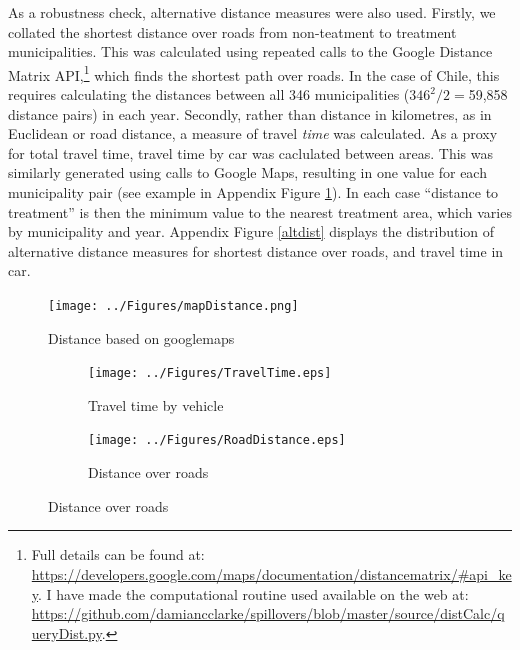 \documentclass[11pt,subeqn]{article}
\begin{document}
\begin{spacing}{1.4}
As a robustness check, alternative distance measures were also used.
Firstly, we collated the shortest distance over roads from non-teatment to 
treatment municipalities.  This was calculated using repeated calls to the 
Google Distance Matrix API,\footnote{Full details can be found at:
\url{https://developers.google.com/maps/documentation/distancematrix/\#api\_key}.
I have made the computational routine used available on the web at:
\url{https://github.com/damiancclarke/spillovers/blob/master/source/distCalc/queryDist.py}.}
which finds the shortest path over roads.  In the case of Chile, this requires 
calculating the distances between all 346 municipalities ($346^2/2=$59,858
distance pairs) in each year.  Secondly, rather than distance in 
kilometres, as in Euclidean or road distance, a measure of travel \emph{time} 
was calculated.  As a proxy for total travel time, travel time by car was 
caclulated between areas.  This was similarly generated using calls to Google 
Maps, resulting in one value for each municipality pair (see example in Appendix
Figure \ref{googdist}).  In each case ``distance to treatment'' is then the 
minimum value to the nearest treatment area, which varies by municipality and 
year.  Appendix Figure \ref{altdist} displays the distribution of alternative
distance measures for shortest distance over roads, and travel time in car.

\begin{figure}[htpb!]
\texttt{[image: ../Figures/mapDistance.png]}
\caption{Distance based on googlemaps}
\label{googdist}
\end{figure}

\begin{figure}[htpb!]
\begin{center}
\caption{Alternative Measures of Distance to Treatment}
\label{altdist}
\begin{subfigure}{.5\textwidth}
  \centering
  \texttt{[image: ../Figures/TravelTime.eps]}
  \caption{Travel time by vehicle}
  \label{travelTime}
\end{subfigure}%
\begin{subfigure}{.5\textwidth}
  \centering
  \texttt{[image: ../Figures/RoadDistance.eps]}
  \caption{Distance over roads}
  \label{roadDist}
\end{subfigure}
\end{center}
\vspace{-4mm}
\end{figure}


\end{spacing}
\end{document}
